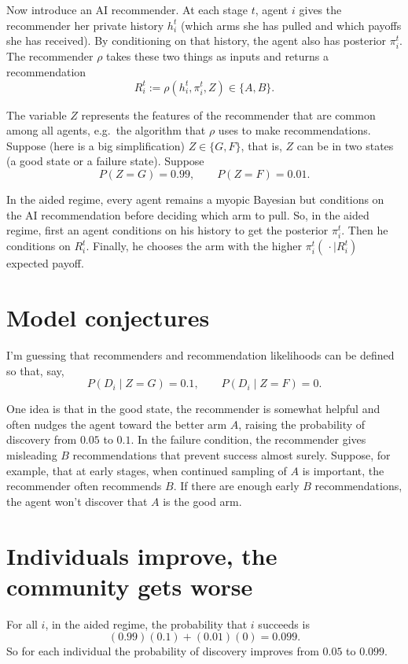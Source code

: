 \documentclass[12pt]{article}
\begin{document}
Now introduce an AI recommender.
At each stage $t$, agent $i$ gives the recommender her private history $h_i^t$ (which arms she has pulled and which payoffs she has received).
By conditioning on that history, the agent also has posterior $\pi_i^t$.
The recommender $\rho$ takes these two things as inputs and returns a recommendation
\[
  R_i^t := \rho(h_i^t, \pi_i^t, Z) \in \{A, B\}.
\]

The variable $Z$ represents the features of the recommender that are common among all agents, e.g.\ the algorithm that $\rho$ uses to make recommendations.
Suppose (here is a big simplification) $Z \in \{G, F\}$, that is, $Z$ can be in two states (a good state or a failure state).
Suppose
\[
  P(Z = G) = 0.99, \qquad P(Z = F) = 0.01.
\]

In the aided regime, every agent remains a myopic Bayesian but conditions on the AI recommendation before deciding which arm to pull.
So, in the aided regime, first an agent conditions on his history to get the posterior $\pi_i^t$.
Then he conditions on $R_i^t$.
Finally, he chooses the arm with the higher $\pi_i^t(\,\cdot \mid R_i^t)$ expected payoff.

\section{Model conjectures}
\label{sec:conj}

I'm guessing that recommenders and recommendation likelihoods can be defined so that, say,
\[
  P(D_i \mid Z = G) = 0.1, \qquad P(D_i \mid Z = F) = 0.
\]

One idea is that in the good state, the recommender is somewhat helpful and often nudges the agent toward the better arm $A$, raising the probability of discovery from $0.05$ to $0.1$.
In the failure condition, the recommender gives misleading $B$ recommendations that prevent success almost surely.
Suppose, for example, that at early stages, when continued sampling of $A$ is important, the recommender often recommends $B$.
If there are enough early $B$ recommendations, the agent won't discover that $A$ is the good arm.

\section{Individuals improve, the community gets worse}
\label{sec:improve}

For all $i$, in the aided regime, the probability that $i$ succeeds is
\[
  (0.99)(0.1) + (0.01)(0) = 0.099.
\]
So for each individual the probability of discovery improves from $0.05$ to $0.099$.
\end{document}

